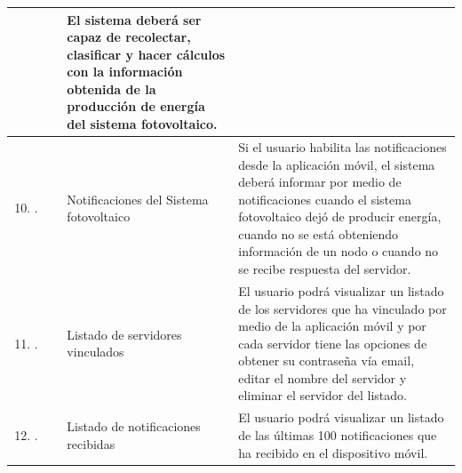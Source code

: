 \begin{longtable}{|M{1.6cm}|M{4.0cm}|M{6.0cm}|}
 	& El sistema deberá ser capaz de recolectar, clasificar y hacer cálculos con la información obtenida de la producción de energía del sistema fotovoltaico. \\
    \hline
    \begin{enumerate}[label=RF\arabic*]
        \setcounter{enumi}{9}
 	    \item.
 	\end{enumerate}
 	& Notificaciones del Sistema fotovoltaico 
 	& Si el usuario habilita las notificaciones desde la aplicación móvil, el sistema deberá informar por medio de notificaciones cuando el sistema fotovoltaico dejó de producir energía, cuando no se está obteniendo información de un nodo o cuando no se recibe respuesta del servidor. \\
    \hline
    \begin{enumerate}[label=RF\arabic*]
        \setcounter{enumi}{10}
 	    \item.
 	\end{enumerate}
 	& Listado de servidores vinculados 
 	& El usuario podrá visualizar un listado de los servidores que ha vinculado por medio de la aplicación móvil y por cada servidor tiene las opciones de obtener su contraseña vía email, editar el nombre del servidor y eliminar el servidor del listado. \\
    \hline
    \begin{enumerate}[label=RF\arabic*]
        \setcounter{enumi}{11}
 	    \item.
 	\end{enumerate}
 	& Listado de notificaciones recibidas 
 	& El usuario podrá visualizar un listado de las últimas 100 notificaciones que ha recibido en el dispositivo móvil. \\
    \hline
    
\end{longtable}